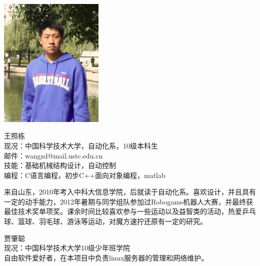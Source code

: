 
\begin{framed}
\noindent \includegraphics[width=50mm]{Figures/context.pic.png}
\parbox[b]{0.6\textwidth}{王照栋\\
现况：中国科学技术大学，自动化系，10级本科生\\
邮件：wangzd@mail.ustc.edu.cn\\
技能：基础机械结构设计，自动控制\\
编程：C语言编程，初步C++面向对象编程，matlab\\
}

来自山东，2010年考入中科大信息学院，后就读于自动化系。喜欢设计，并且具有一定的动手能力，2012年暑期与同学组队参加过Robogame机器人大赛，并最终获最佳技术奖单项奖。课余时间比较喜欢参与一些运动以及益智类的活动，热爱乒乓球、篮球、羽毛球、游泳等运动，对魔方速拧还原有一定的研究。
\end{framed}

\begin{framed}
\noindent
{贾肇聪\\
现况：中国科学技术大学10级少年班学院\\
}
自由软件爱好者，在本项目中负责linux服务器的管理和网络维护。
\end{framed}


